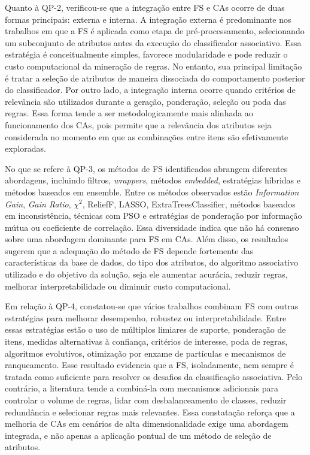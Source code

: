 Quanto à QP-2, verificou-se que a integração entre FS e CAs ocorre de duas formas principais: externa e interna. A integração externa é predominante nos trabalhos em que a FS é aplicada como etapa de pré-processamento, selecionando um subconjunto de atributos antes da execução do classificador associativo. Essa estratégia é conceitualmente simples, favorece modularidade e pode reduzir o custo computacional da mineração de regras. No entanto, sua principal limitação é tratar a seleção de atributos de maneira dissociada do comportamento posterior do classificador. Por outro lado, a integração interna ocorre quando critérios de relevância são utilizados durante a geração, ponderação, seleção ou poda das regras. Essa forma tende a ser metodologicamente mais alinhada ao funcionamento dos CAs, pois permite que a relevância dos atributos seja considerada no momento em que as combinações entre itens são efetivamente exploradas.

No que se refere à QP-3, os métodos de FS identificados abrangem diferentes abordagens, incluindo filtros, \textit{wrappers}, métodos \textit{embedded}, estratégias híbridas e métodos baseados em ensemble. Entre os métodos observados estão \textit{Information Gain}, \textit{Gain Ratio}, $\chi^2$, ReliefF, LASSO, ExtraTreesClassifier, métodos baseados em inconsistência, técnicas com PSO e estratégias de ponderação por informação mútua ou coeficiente de correlação. Essa diversidade indica que não há consenso sobre uma abordagem dominante para FS em CAs. Além disso, os resultados sugerem que a adequação do método de FS depende fortemente das características da base de dados, do tipo dos atributos, do algoritmo associativo utilizado e do objetivo da solução, seja ele aumentar acurácia, reduzir regras, melhorar interpretabilidade ou diminuir custo computacional.

Em relação à QP-4, constatou-se que vários trabalhos combinam FS com outras estratégias para melhorar desempenho, robustez ou interpretabilidade. Entre essas estratégias estão o uso de múltiplos limiares de suporte, ponderação de itens, medidas alternativas à confiança, critérios de interesse, poda de regras, algoritmos evolutivos, otimização por enxame de partículas e mecanismos de ranqueamento. Esse resultado evidencia que a FS, isoladamente, nem sempre é tratada como suficiente para resolver os desafios da classificação associativa. Pelo contrário, a literatura tende a combiná-la com mecanismos adicionais para controlar o volume de regras, lidar com desbalanceamento de classes, reduzir redundância e selecionar regras mais relevantes. Essa constatação reforça que a melhoria de CAs em cenários de alta dimensionalidade exige uma abordagem integrada, e não apenas a aplicação pontual de um método de seleção de atributos.

